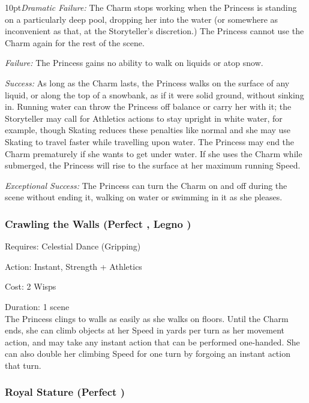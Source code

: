 \begin{myindentpar}{10pt}\emph{Dramatic Failure:} The Charm stops working when the Princess is standing on a particularly deep pool, dropping her into the water (or somewhere as inconvenient as that, at the Storyteller's discretion.) The Princess cannot use the Charm again for the rest of the scene.
 
\emph{Failure:} The Princess gains no ability to walk on liquids or atop snow.

\emph{Success:} As long as the Charm lasts, the Princess walks on the surface of any liquid, or along the top of a snowbank, as if it were solid ground, without sinking in. Running water can throw the Princess off balance or carry her with it; the Storyteller may call for Athletics actions to stay upright in white water, for example, though Skating reduces these penalties like normal and she may use Skating to travel faster while travelling upon water. The Princess may end the Charm prematurely if she wants to get under water. If she uses the Charm while submerged, the Princess will rise to the surface at her maximum running Speed.

\emph{Exceptional Success:} The Princess can turn the Charm on and off during the scene without ending it, walking on water or swimming in it as she pleases.\end{myindentpar}

\subsubsection*{Crawling the Walls (Perfect \textbullet\textbullet\textbullet, Legno \textbullet\textbullet)}

\noindent Requires: Celestial Dance (Gripping)

\noindent Action: Instant, Strength + Athletics

\noindent Cost: 2 Wisps

\noindent Duration: 1 scene \\

\noindent The Princess clings to walls as easily as she walks on floors. Until the Charm ends, she can climb objects at her Speed in yards per turn as her movement action, and may take any instant action that can be performed one-handed. She can also double her climbing Speed for one turn by forgoing an instant action that turn.

\subsubsection*{Royal Stature (Perfect \textbullet\textbullet\textbullet\textbullet)}

